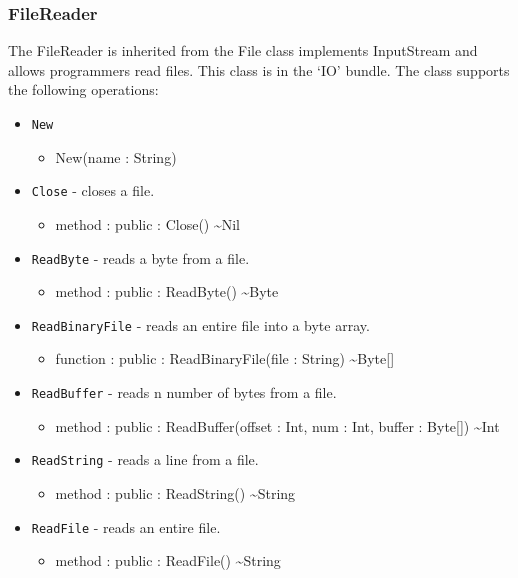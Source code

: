 \documentclass[11pt]{article}
\begin{document}
\subsubsection{FileReader}
The FileReader is inherited from the File class implements InputStream and allows programmers
read files.  This class is in the `IO' bundle.  The class supports the
following operations:
\begin{itemize}
\item \texttt{New}
  \begin{itemize}
  \item New(name : String)
  \end{itemize}
\item \texttt{Close} - closes a file.
  \begin{itemize}
  \item method : public : Close() \textasciitilde Nil
  \end{itemize}
\item \texttt{ReadByte} - reads a byte from a file.
  \begin{itemize}
  \item method : public : ReadByte() \textasciitilde Byte
  \end{itemize}
\item \texttt{ReadBinaryFile} - reads an entire file into a byte array.
  \begin{itemize}
  \item function : public : ReadBinaryFile(file : String) \textasciitilde Byte[]
  \end{itemize}
\item \texttt{ReadBuffer} - reads n number of bytes from a file.
  \begin{itemize}
  \item method : public : ReadBuffer(offset : Int, num : Int, buffer :
    Byte[]) \textasciitilde Int
  \end{itemize}
\item \texttt{ReadString} - reads a line from a file.
  \begin{itemize}
  \item method : public : ReadString() \textasciitilde String
  \end{itemize}
\item \texttt{ReadFile} - reads an entire file.
  \begin{itemize}
  \item method : public : ReadFile() \textasciitilde String
  \end{itemize}
\end{itemize}
\end{document}
